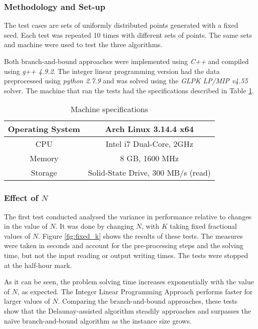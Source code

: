 \subsubsection*{Methodology and Set-up}
The test cases are sets of uniformly distributed points generated with a fixed seed. Each test was repeated 10 times with different sets of points. The same sets and machine were used to test the three algorithms.

Both branch-and-bound approaches were implemented using \emph{C++} and compiled using \emph{g++ 4.9.2}. The integer linear programming version had the data preprocessed using \emph{python 2.7.9} and was solved using the \emph{GLPK LP/MIP v4.55} solver. The machine that ran the tests had the specifications described in Table \ref{tab:specs}.

\begin{table}[H]
	\begin{center}
		\begin{tabular}{|c|c|}
			\hline
			Operating System  & Arch Linux 3.14.4 x64\\\hline
			CPU & Intel i7 Dual-Core, 2GHz\\\hline
			Memory & 8 GB, 1600 MHz \\\hline
			Storage &  Solid-State Drive, 300 MB/s (read)\\\hline
		\end{tabular}
		\caption{Machine specifications}
		\label{tab:specs}
	\end{center}
\end{table}

\subsubsection*{Effect of $N$}

The first test conducted analysed the variance in performance relative to changes in the value of $N$. It was done by changing $N$, with $K$ taking fixed fractional values of $N$. Figure \ref{fig:fixed_k} shows the results of these tests. The measures were taken in seconds and account for the pre-processing steps and the solving time, but not the input reading or output writing times. The tests were stopped at the half-hour mark. 

\noindent
As it can be seen, the problem solving time increases exponentially with the value of $N$, as expected.
The Integer Linear Programming Approach performs faster for larger values of $N$. Comparing the branch-and-bound approaches, these tests show that the Delaunay-assisted algorithm steadily approaches and surpasses the naïve branch-and-bound algorithm as the instance size grows.
